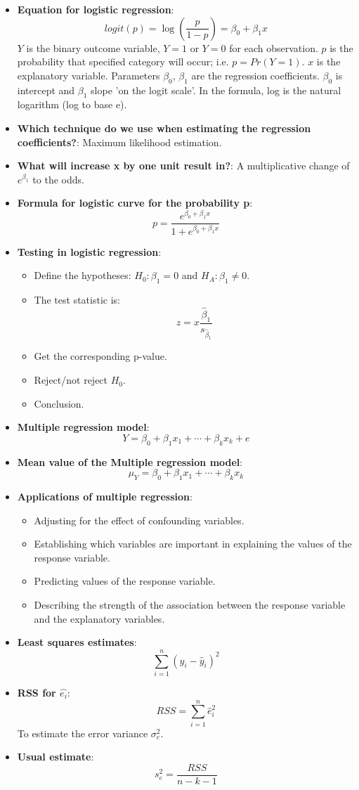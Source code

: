 \documentclass[12pt]{book}
\begin{document}
\begin{itemize}
\begin{figure}[H]
\end{figure}
\item \textbf{Equation for logistic regression}: 
$$logit(p) = \log\left(\frac{p}{1-p}\right) = \beta_0 + \beta_1x$$
$Y$ is the binary outcome variable, $Y = 1$ or $Y = 0$ for each observation. $p$ is the probability that specified category will occur; i.e. $p = Pr(Y = 1)$. $x$ is the explanatory variable. Parameters $\beta_0$, $\beta_1$ are the regression coefficients. $\beta_0$ is intercept and $\beta_1$ slope 'on the logit scale'. In the formula, log is the natural logarithm (log to base e).
\item \textbf{Which technique do we use when estimating the regression coefficients?}: Maximum likelihood estimation.
\item \textbf{What will increase x by one unit result in?}: A multiplicative change of $e^{\beta_1}$ to the odds.
\item \textbf{Formula for logistic curve for the probability p}: 
$$p = \frac{e^{\beta_0 + \beta_1x}}{1+e^{\beta_0 + \beta_1x}}$$
\item \textbf{Testing in logistic regression}:
\begin{itemize}
\item Define the hypotheses: $H_0 : \beta_1 = 0$ and $H_A : \beta_1 \neq 0$.
\item The test statistic is: 
$$z = x\frac{\hat{\beta}_1}{s_{\hat{\beta}_1}}$$
\item Get the corresponding p-value.
\item Reject/not reject $H_0$.
\item Conclusion.
\end{itemize}
\item \textbf{Multiple regression model}:
$$Y = \beta_0 + \beta_1x_1 + \cdots + \beta_kx_k + e$$
\item \textbf{Mean value of the Multiple regression model}: 
$$\mu_Y = \beta_0 + \beta_1x_{1} + \cdots + \beta_kx_{k}$$
\item \textbf{Applications of multiple regression}:
\begin{itemize}
\item Adjusting for the effect of confounding variables.
\item Establishing which variables are important in explaining the values of the response variable.
\item Predicting values of the response variable.
\item Describing the strength of the association between the response variable and the explanatory variables.
\end{itemize}
\item \textbf{Least squares estimates}: 
$$\sum_{i=1}^{n} (y_i - \hat{y}_i)^2$$
\item \textbf{RSS for $\hat{e_i}$}: 
$$RSS = \sum_{i=1}^{n} \hat{e}_i^2$$
To estimate the error variance $\sigma^2_e$.
\item \textbf{Usual estimate}: 
$$s_e^2 = \frac{RSS}{n - k - 1}$$
\end{itemize}
\end{document}
